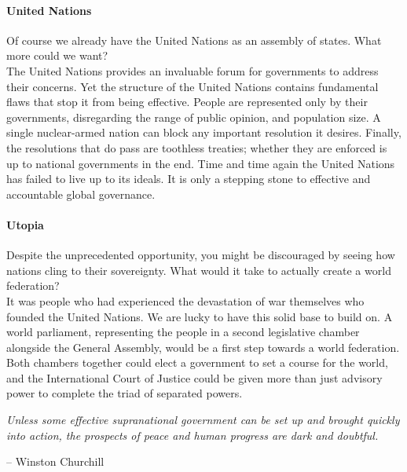 \documentclass[11pt,a4paper]{article}
\begin{document}
\begin{multicols}{2}
\paragraph{United Nations}

Of course we already have the United Nations as an assembly of states. What more could we want?\\
\noindent The United Nations provides an invaluable forum for governments to address their concerns.
Yet the structure of the United Nations contains fundamental flaws that stop it from being effective.
People are represented only by their governments, disregarding the range of public opinion, and population size.
A single nuclear-armed nation can block any important resolution it desires.
Finally, the resolutions that do pass are toothless treaties; whether they are enforced is up to national governments in the end.
Time and time again the United Nations has failed to live up to its ideals.
It is only a stepping stone to effective and accountable global governance.


\paragraph{Utopia}

Despite the unprecedented opportunity, you might be discouraged by seeing how nations cling to their sovereignty. What would it take to actually create a world federation?\\
\noindent It was people who had experienced the devastation of war themselves who founded the United Nations. We are lucky to have this solid base to build on.
A world parliament, representing the people in a second legislative chamber alongside the General Assembly, would be a first step towards a world federation.
Both chambers together could elect a government to set a course for the world, and the International Court of Justice could be given more than just advisory power to complete the triad of separated powers.

\begin{shaded*}
\noindent \textit{Unless some effective supranational government can be set up and brought quickly into action, the prospects of peace and human progress are dark and doubtful.}
\begin{flushright}
-- Winston Churchill
\end{flushright}
\vspace{-12pt}
\end{shaded*}

\end{multicols}
\end{document}

